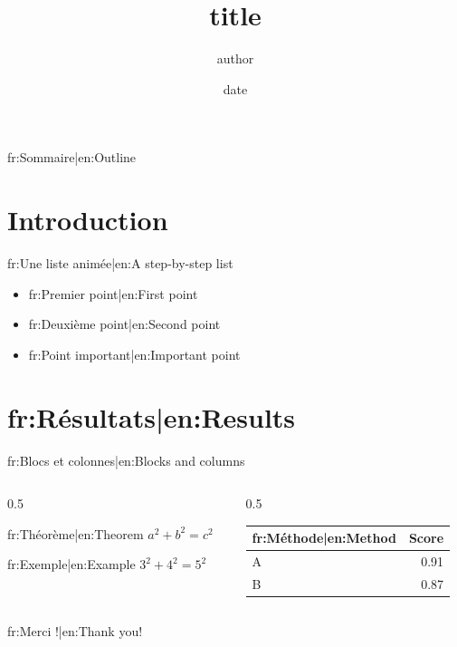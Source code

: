 \documentclass[aspectratio=169]{beamer}
\title{{{title}}}
\author{{{author}}}
\institute{{{institution}}}
\date{{{date}}}
\begin{document}
\begin{frame}
  \titlepage
\end{frame}

\begin{frame}{{{fr:Sommaire|en:Outline}}}
  \tableofcontents
\end{frame}

\section{Introduction}

\begin{frame}{{{fr:Une liste animée|en:A step-by-step list}}}
  \begin{itemize}
    \item<1-> {{fr:Premier point|en:First point}}
    \item<2-> {{fr:Deuxième point|en:Second point}}
    \item<3-> \alert{{{fr:Point important|en:Important point}}}
  \end{itemize}
\end{frame}

\section{{{fr:Résultats|en:Results}}}

\begin{frame}{{{fr:Blocs et colonnes|en:Blocks and columns}}}
  \begin{columns}
    \begin{column}{0.5\textwidth}
      \begin{block}{{{fr:Théorème|en:Theorem}}}
        $a^2 + b^2 = c^2$
      \end{block}
      \begin{exampleblock}{{{fr:Exemple|en:Example}}}
        $3^2 + 4^2 = 5^2$
      \end{exampleblock}
    \end{column}
    \begin{column}{0.5\textwidth}
      \centering
      \begin{tabular}{lr}
        \toprule
        {{fr:Méthode|en:Method}} & Score \\
        \midrule
        A & 0.91 \\
        B & 0.87 \\
        \bottomrule
      \end{tabular}
    \end{column}
  \end{columns}
\end{frame}

\begin{frame}
  \centering\Huge {{fr:Merci !|en:Thank you!}}
\end{frame}
\end{document}
